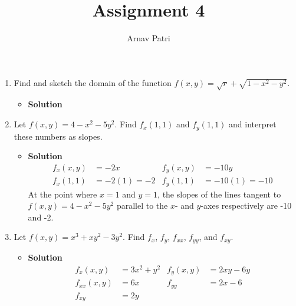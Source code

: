 \documentclass[12pt, A4]{article}
\title{Assignment 4}
\author{Arnav Patri}
\begin{document}
	\maketitle
		\begin{enumerate}[1)]
			\item
				Find and sketch the domain of the function $f(x, y) = \sqrt{r} + \sqrt{1 - x^2 - y^2}$.
				\begin{itemize}
					\item[] \textbf{Solution}
				\end{itemize}
			\item
				Let $f(x, y) = 4 - x^2 - 5y^2$. Find $f_x(1, 1)$ and $f_y(1, 1)$ and interpret these numbers as slopes.
				\begin{itemize}
					\item[] \textbf{Solution}
						\begin{align*}
							f_x(x, y) &= -2x &
									f_y(x, y) &= -10y \\
							f_x(1, 1) &= -2(1) = -2 &
									f_y(1, 1) &= -10(1) = -10
						\end{align*}
						At the point where $x = 1$ and $y = 1$, the slopes of the lines tangent to $f(x, y) = 4 - x^2 - 5y^2$ parallel to the $x$- and $y$-axes respectively are -10 and -2.
				\end{itemize}

			\item
				Let $f(x, y) = x^3 + xy^2 - 3y^2$. Find $f_x$, $f_y$, $f_{xx}$, $f_{yy}$, and $f_{xy}$.
				\begin{itemize}
					\item[] \textbf{Solution}
						\begin{align*}
							f_x(x, y) &= 3x ^2 + y^2 &
									f_y(x, y) &= 2xy - 6y \\
							f_{xx}(x, y) &= 6x &
									f_{yy} &= 2x - 6 \\
							f_{xy} &= 2y
						\end{align*}
				\end{itemize}
		\end{enumerate}
\end{document}
